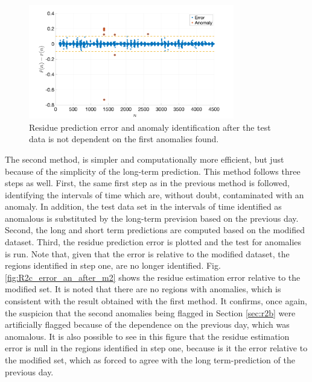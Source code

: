 \documentclass[a4paper, oneside, 11pt]{article}
\begin{document}
\begin{figure}[htbp]
	\centering
	\includegraphics[width= 0.8\textwidth]{figures/R2c_error_an_after.png}
	\caption{Residue prediction error and anomaly identification after the test data is not dependent on the first anomalies found.}
	\label{fig:R2c_error_an_after}
\end{figure}

The second method, is simpler and computationally more efficient, but just because of the simplicity of the long-term prediction. This method follows three steps as well. First, the same first step as in the previous method is followed, identifying the intervals of time which are, without doubt, contaminated with an anomaly. In addition, the test data set in the intervals of time identified as anomalous is substituted by the long-term prevision based on the previous day. Second, the long and short term predictions are computed based on the modified dataset. Third, the residue prediction error is plotted and the test for anomalies is run. Note that, given that the error is relative to the modified dataset, the regions identified in step one, are no longer identified. Fig. \ref{fig:R2c_error_an_after_m2} shows the residue estimation error relative to the modified set. It is noted that there are no regions with anomalies, which is consistent with the result obtained with the first method. It confirms, once again, the suspicion that the second anomalies being flagged in Section \ref{sec:r2b} were artificially flagged because of the dependence on the previous day, which was anomalous. It is also possible to see in this figure that the residue estimation error is null in the regions identified in step one, because is it the error relative to the modified set, which as forced to agree with the long term-prediction of the previous day.
\end{document}
